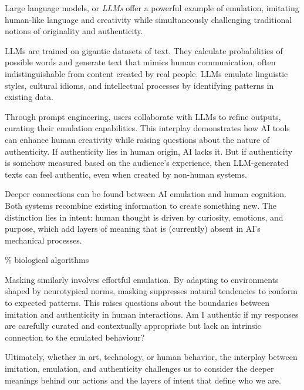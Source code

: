 Large language models, or \textit{LLMs} offer a powerful example of emulation, imitating human-like language and creativity while simultaneously challenging traditional notions of originality and authenticity.

LLMs are trained on gigantic datasets of text. They calculate probabilities of possible words and generate text that mimics human communication, often indistinguishable from content created by real people. LLMs emulate linguistic styles, cultural idioms, and intellectual processes by identifying patterns in existing data. 

Through prompt engineering, users collaborate with LLMs to refine outputs, curating their emulation capabilities. This interplay demonstrates how AI tools can enhance human creativity while raising questions about the nature of authenticity. If authenticity lies in human origin, AI lacks it. But if authenticity is somehow measured based on the audience's experience, then LLM-generated texts can feel authentic, even when created by non-human systems.

Deeper connections can be found between AI emulation and human cognition. Both systems recombine existing information to create something new. The distinction lies in intent: human thought is driven by curiosity, emotions, and purpose, which add layers of meaning that is (currently) absent in AI's mechanical processes.

{\scriptsize \textcolor{comment}{\%  biological algorithms}}

Masking similarly involves effortful emulation. By adapting to environments shaped by neurotypical norms, masking suppresses natural tendencies to conform to expected patterns. This raises questions about the boundaries between imitation and authenticity in human interactions. Am I authentic if my responses are carefully curated and contextually appropriate but lack an intrinsic connection to the emulated behaviour?

Ultimately, whether in art, technology, or human behavior, the interplay between imitation, emulation, and authenticity challenges us to consider the deeper meanings behind our actions and the layers of intent that define who we are.